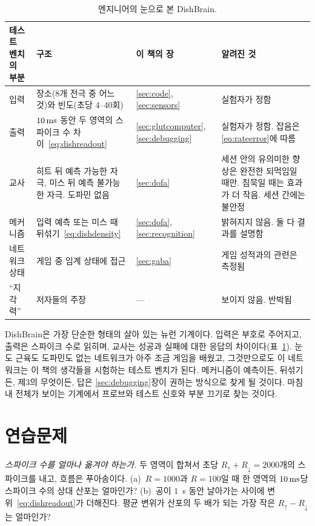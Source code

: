\begin{table}[t]
\centering
\footnotesize
\setlength{\tabcolsep}{4pt}
\renewcommand{\arraystretch}{1.15}
\begin{tabular}{>{\raggedright}p{2.1cm}>{\raggedright}p{4.2cm}>{\raggedright}p{1.9cm}>{\raggedright\arraybackslash}p{4.6cm}}
\toprule
테스트 벤치의 부분 & 구조 & 이 책의 장 & 알려진 것 \\
\midrule
입력 & 장소(8개 전극 중 어느 것)와 빈도(초당 4--40회) & \ref{sec:code}, \ref{sec:sensors} & 실험자가 정함 \\
출력 & $10\,\text{ms}$ 동안 두 영역의 스파이크 수 차이~\eqref{eq:dishreadout} & \ref{sec:glutcomputer}, \ref{sec:debugging} & 실험자가 정함. 잡음은 \eqref{eq:rateerror}에 따름 \\
교사 & 히트 뒤 예측 가능한 자극, 미스 뒤 예측 불가능한 자극. 도파민 없음 & \ref{sec:dofa} & 세션 안의 유의미한 향상은 완전한 되먹임일 때만. 침묵일 때는 효과가 더 작음. 세션 간에는 불안정 \\
메커니즘 & 입력 예측 또는 미스 때 뒤섞기~\eqref{eq:dishdensity} & \ref{sec:dofa}, \ref{sec:recognition} & 밝혀지지 않음. 둘 다 결과를 설명함 \\
네트워크 상태 & 게임 중 임계 상태에 접근 & \ref{sec:gaba} & 게임 성적과의 관련은 측정됨 \\
“지각력” & 저자들의 주장 & --- & 보이지 않음. 반박됨 \\
\bottomrule
\end{tabular}
\caption{엔지니어의 눈으로 본 DishBrain.}
\label{tab:dishbrain}
\end{table}

DishBrain은 가장 단순한 형태의 살아 있는 뉴런 기계이다. 입력은 부호로 주어지고, 출력은 스파이크 수로 읽히며, 교사는 성공과 실패에 대한 응답의 차이이다(표~\ref{tab:dishbrain}). 눈도 근육도 도파민도 없는 네트워크가 아주 조금 게임을 배웠고, 그것만으로도 이 네트워크는 이 책의 생각들을 시험하는 테스트 벤치가 된다. 메커니즘이 예측이든, 뒤섞기든, 제3의 무엇이든, 답은 \ref{sec:debugging}장이 권하는 방식으로 찾게 될 것이다. 마침내 전체가 보이는 기계에서 프로브와 테스트 신호와 부분 끄기로 찾는 것이다.

\section{연습문제}

\begin{exercise}[\lvlA]
\label{ex:22:1}
\emph{스파이크 수를 얼마나 옮겨야 하는가.} 두 영역이 합쳐서 초당 $R_\uparrow+R_\downarrow=2000$개의 스파이크를 내고, 흐름은 푸아송이다. (a)~$R=1000$과 $R=100$일 때 한 영역의 $10\,\text{ms}$당 스파이크 수의 상대 산포는 얼마인가? (b)~공이 $1$~s 동안 날아가는 사이에 변위~\eqref{eq:dishreadout}가 더해진다. 평균 변위가 산포의 두 배가 되는 가장 작은 $R_\uparrow-R_\downarrow$는 얼마인가?
\end{exercise}

